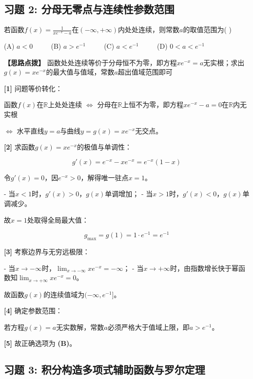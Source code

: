 \documentclass[11pt,a4paper,UTF8]{ctexart}
\begin{document}
\subsection{习题 2: 分母无零点与连续性参数范围}

若函数$f(x) = \frac{1}{xe^{-x} - a}$在$(-\infty, +\infty)$内处处连续，则常数$a$的取值范围为( )

(A) $a < 0$ $\qquad$ (B) $a > e^{-1}$ $\qquad$ (C) $a < e^{-1}$ $\qquad$ (D) $0 < a < e^{-1}$

\textbf{\color{DeepPurple}【思路点拨】} 函数处处连续等价于分母恒不为零，即方程$xe^{-x} = a$无实根；求出$g(x) = xe^{-x}$的最大值与值域，常数$a$超出值域范围即可


\begin{solbox}[分步推导与答题规范]
\textbf{[1]} 问题等价转化：

函数$f(x)$在$\mathbb{R}$上处处连续 $\iff$ 分母在$\mathbb{R}$上恒不为零，即方程$xe^{-x} - a = 0$在$\mathbb{R}$内无实根

	    $\iff$ 水平直线$y = a$与曲线$y = g(x) = xe^{-x}$无交点。

\textbf{[2]} 求函数$g(x) = xe^{-x}$的极值与单调性：


\begin{equation*}
g'(x) = e^{-x} - x e^{-x} = e^{-x}(1 - x)
\end{equation*}


令$g'(x) = 0$，因$e^{-x} > 0$，解得唯一驻点$x = 1$。

- 当$x < 1$时，$g'(x) > 0$，$g(x)$单调增加；
- 当$x > 1$时，$g'(x) < 0$，$g(x)$单调减少。

故$x = 1$处取得全局最大值：


\begin{equation*}
g_{\max} = g(1) = 1 \cdot e^{-1} = e^{-1}
\end{equation*}


\textbf{[3]} 考察边界与无穷远极限：

- 当$x \to -\infty$时，$\lim_{x \to -\infty} xe^{-x} = -\infty$；
- 当$x \to +\infty$时，由指数增长快于幂函数知$\lim_{x \to +\infty} xe^{-x} = 0$。

故函数$g(x)$的连续值域为$(-\infty, e^{-1}]$。

\textbf{[4]} 确定参数范围：

若方程$g(x) = a$无实数解，常数$a$必须严格大于值域上限，即$a > e^{-1}$。

\textbf{[5]} 故正确选项为 \textbf{(B)}。
\end{solbox}


\subsection{习题 3: 积分构造多项式辅助函数与罗尔定理}
\end{document}
